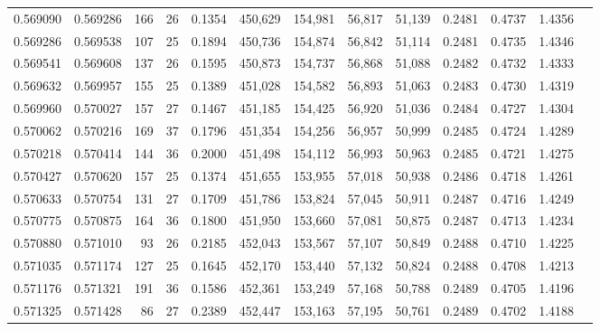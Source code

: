\begin{tabular}{rrrrrrrrrrrrr}
0.569090 & 0.569286 &    166 &    26 &                                     0.1354 & 450,629 & 154,981 &  56,817 &  51,139 & 0.2481 & 0.4737 & 1.4356 \\
0.569286 & 0.569538 &    107 &    25 &                                     0.1894 & 450,736 & 154,874 &  56,842 &  51,114 & 0.2481 & 0.4735 & 1.4346 \\
0.569541 & 0.569608 &    137 &    26 &                                     0.1595 & 450,873 & 154,737 &  56,868 &  51,088 & 0.2482 & 0.4732 & 1.4333 \\
0.569632 & 0.569957 &    155 &    25 &                                     0.1389 & 451,028 & 154,582 &  56,893 &  51,063 & 0.2483 & 0.4730 & 1.4319 \\
0.569960 & 0.570027 &    157 &    27 &                                     0.1467 & 451,185 & 154,425 &  56,920 &  51,036 & 0.2484 & 0.4727 & 1.4304 \\
0.570062 & 0.570216 &    169 &    37 &                                     0.1796 & 451,354 & 154,256 &  56,957 &  50,999 & 0.2485 & 0.4724 & 1.4289 \\
0.570218 & 0.570414 &    144 &    36 &                                     0.2000 & 451,498 & 154,112 &  56,993 &  50,963 & 0.2485 & 0.4721 & 1.4275 \\
0.570427 & 0.570620 &    157 &    25 &                                     0.1374 & 451,655 & 153,955 &  57,018 &  50,938 & 0.2486 & 0.4718 & 1.4261 \\
0.570633 & 0.570754 &    131 &    27 &                                     0.1709 & 451,786 & 153,824 &  57,045 &  50,911 & 0.2487 & 0.4716 & 1.4249 \\
0.570775 & 0.570875 &    164 &    36 &                                     0.1800 & 451,950 & 153,660 &  57,081 &  50,875 & 0.2487 & 0.4713 & 1.4234 \\
0.570880 & 0.571010 &     93 &    26 &                                     0.2185 & 452,043 & 153,567 &  57,107 &  50,849 & 0.2488 & 0.4710 & 1.4225 \\
0.571035 & 0.571174 &    127 &    25 &                                     0.1645 & 452,170 & 153,440 &  57,132 &  50,824 & 0.2488 & 0.4708 & 1.4213 \\
0.571176 & 0.571321 &    191 &    36 &                                     0.1586 & 452,361 & 153,249 &  57,168 &  50,788 & 0.2489 & 0.4705 & 1.4196 \\
0.571325 & 0.571428 &     86 &    27 &                                     0.2389 & 452,447 & 153,163 &  57,195 &  50,761 & 0.2489 & 0.4702 & 1.4188 \\

\end{tabular}
